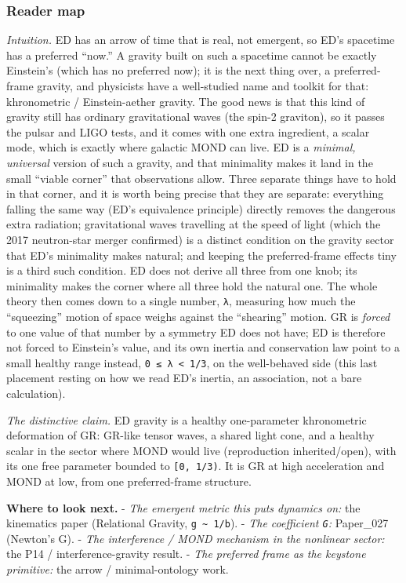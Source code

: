 \documentclass[
]{article}
\begin{document}
\subsubsection{Reader map}\label{reader-map}

\emph{Intuition.} ED has an arrow of time that is real, not emergent, so
ED's spacetime has a preferred ``now.'' A gravity built on such a
spacetime cannot be exactly Einstein's (which has no preferred now); it
is the next thing over, a preferred-frame gravity, and physicists have a
well-studied name and toolkit for that: khronometric / Einstein-aether
gravity. The good news is that this kind of gravity still has ordinary
gravitational waves (the spin-2 graviton), so it passes the pulsar and
LIGO tests, and it comes with one extra ingredient, a scalar mode, which
is exactly where galactic MOND can live. ED is a \emph{minimal,
universal} version of such a gravity, and that minimality makes it land
in the small ``viable corner'' that observations allow. Three separate
things have to hold in that corner, and it is worth being precise that
they are separate: everything falling the same way (ED's equivalence
principle) directly removes the dangerous extra radiation; gravitational
waves travelling at the speed of light (which the 2017 neutron-star
merger confirmed) is a distinct condition on the gravity sector that
ED's minimality makes natural; and keeping the preferred-frame effects
tiny is a third such condition. ED does not derive all three from one
knob; its minimality makes the corner where all three hold the natural
one. The whole theory then comes down to a single number, \texttt{λ},
measuring how much the ``squeezing'' motion of space weighs against the
``shearing'' motion. GR is \emph{forced} to one value of that number by
a symmetry ED does not have; ED is therefore not forced to Einstein's
value, and its own inertia and conservation law point to a small healthy
range instead, \texttt{0\ ≤\ λ\ \textless{}\ 1/3}, on the well-behaved
side (this last placement resting on how we read ED's inertia, an
association, not a bare calculation).

\emph{The distinctive claim.} ED gravity is a healthy one-parameter
khronometric deformation of GR: GR-like tensor waves, a shared light
cone, and a healthy scalar in the sector where MOND would live
(reproduction inherited/open), with its one free parameter bounded to
\texttt{{[}0,\ 1/3)}. It is GR at high acceleration and MOND at low,
from one preferred-frame structure.

\textbf{Where to look next.} - \emph{The emergent metric this puts
dynamics on:} the kinematics paper (Relational Gravity,
\texttt{g\ \textasciitilde{}\ 1/b}). - \emph{The coefficient
\texttt{G}:} Paper\_027 (Newton's G). - \emph{The interference / MOND
mechanism in the nonlinear sector:} the P14 / interference-gravity
result. - \emph{The preferred frame as the keystone primitive:} the
arrow / minimal-ontology work.
\end{document}
